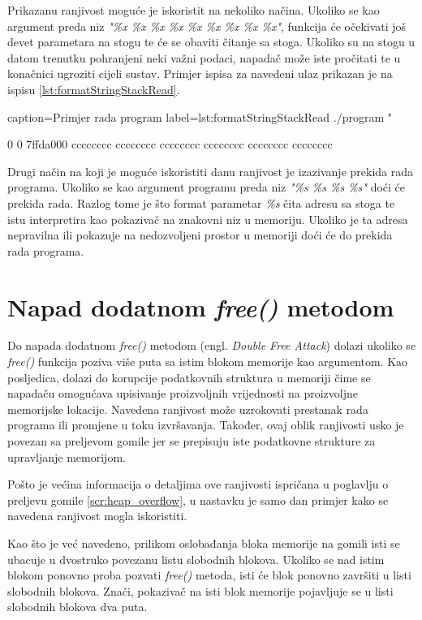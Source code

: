 \documentclass[times, utf8, diplomski, numeric]{fer}
\begin{document}
Prikazanu ranjivost moguće je iskoristit na nekoliko načina.
Ukoliko se kao argument preda niz \emph{"\%x \%x \%x \%x \%x \%x
\%x \%x \%x"}, funkcija će očekivati još devet parametara na
stogu te će se obaviti čitanje sa stoga. Ukoliko su na stogu u
datom trenutku pohranjeni neki važni podaci, napadač može iste
pročitati te u konačnici ugroziti cijeli sustav. Primjer ispisa
za navedeni ulaz prikazan je na ispisu 
\ref{lst:formatStringStackRead}.

\begin{ispis} {caption=Primjer rada program} {label=lst:formatStringStackRead}
./program "%

0 0 7ffda000 cccccccc cccccccc cccccccc cccccccc cccccccc cccccccc
\end{ispis}

Drugi način na koji je moguće iskoristiti danu ranjivost je
izazivanje prekida rada programa. Ukoliko se kao argument
programu preda niz \emph{"\%s \%s \%s \%s"} doći će prekida rada.
Razlog tome je što format parametar \emph{\%s} čita adresu sa
stoga te istu interpretira kao pokazivač na znakovni niz u
memoriju. Ukoliko je ta adresa nepravilna ili pokazuje na
nedozvoljeni prostor u memoriji doći će do prekida rada programa.

\section{Napad dodatnom \emph{free()} metodom}

Do napada dodatnom \emph{free()} metodom (engl. \emph{Double Free
Attack}) dolazi ukoliko se \emph{free()} funkcija poziva više
puta sa istim blokom memorije kao argumentom. Kao posljedica,
dolazi do korupcije podatkovnih struktura u memoriji čime se
napadaču omogućava upisivanje proizvoljnih vrijednosti na
proizvoljne memorijske lokacije. Navedena ranjivost može
uzrokovati prestanak rada programa ili promjene u toku
izvršavanja. Također, ovaj oblik ranjivosti usko je povezan sa
preljevom gomile jer se prepisuju iste podatkovne strukture za
upravljanje memorijom.

Pošto je većina informacija o detaljima ove ranjivosti ispričana
u poglavlju o preljevu gomile \ref{scr:heap_overflow}, u nastavku
je samo dan primjer kako se navedena ranjivost mogla iskoristiti.

Kao što je već navedeno, prilikom oslobađanja bloka memorije na
gomili isti se ubacuje u dvostruko povezanu listu slobodnih
blokova. Ukoliko se nad istim blokom ponovno proba pozvati
\emph{free()} metoda, isti će blok ponovno završiti u listi
slobodnih blokova. Znači, pokazivač na isti blok memorije
pojavljuje se u listi slobodnih blokova dva puta.
\end{document}
